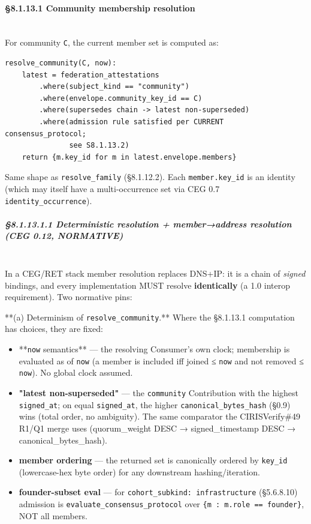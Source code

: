 \documentclass[10pt]{article}
\begin{document}
\paragraph{§8.1.13.1 Community membership resolution}\mbox{}\\


For community \texttt{C}, the current member set is computed as:


\begin{lstlisting}
resolve_community(C, now):
    latest = federation_attestations
        .where(subject_kind == "community")
        .where(envelope.community_key_id == C)
        .where(supersedes chain -> latest non-superseded)
        .where(admission rule satisfied per CURRENT consensus_protocol;
               see S8.1.13.2)
    return {m.key_id for m in latest.envelope.members}
\end{lstlisting}

Same shape as \texttt{resolve\_family} (§8.1.12.2). Each \texttt{member.key\_id} is an identity (which may itself have a multi-occurrence set via CEG 0.7 \texttt{identity\_occurrence}).


\subparagraph{§8.1.13.1.1 Deterministic resolution + member→address resolution (CEG 0.12, NORMATIVE)}\mbox{}\\


In a CEG/RET stack member resolution replaces DNS+IP: it is a chain of \textit{signed} bindings, and every implementation MUST resolve \textbf{identically} (a 1.0 interop requirement). Two normative pins:


**(a) Determinism of \texttt{resolve\_community}.** Where the §8.1.13.1 computation has choices, they are fixed:

\begin{itemize}\setlength\itemsep{0pt}
\item **\texttt{now} semantics** — the resolving Consumer's own clock; membership is evaluated as of \texttt{now} (a member is included iff joined ≤ \texttt{now} and not removed ≤ \texttt{now}). No global clock assumed.
\item \textbf{"latest non-superseded"} — the \texttt{community} Contribution with the highest \texttt{signed\_at}; on equal \texttt{signed\_at}, the higher \texttt{canonical\_bytes\_hash} (§0.9) wins (total order, no ambiguity). The same comparator the CIRISVerify\#49 R1/Q1 merge uses (quorum\_weight DESC → signed\_timestamp DESC → canonical\_bytes\_hash).
\item \textbf{member ordering} — the returned set is canonically ordered by \texttt{key\_id} (lowercase-hex byte order) for any downstream hashing/iteration.
\item \textbf{founder-subset eval} — for \texttt{cohort\_subkind: infrastructure} (§5.6.8.10) admission is \texttt{evaluate\_consensus\_protocol} over \texttt{\{m : m.role == founder\}}, NOT all members.
\end{itemize}
\end{document}

